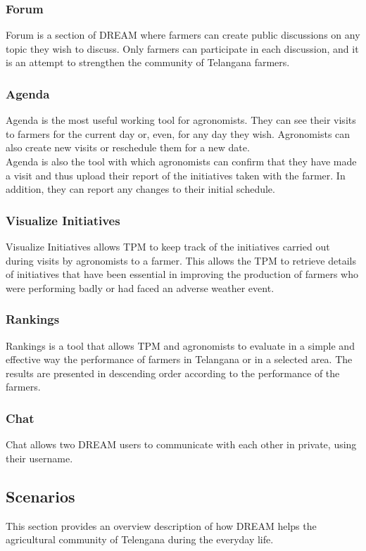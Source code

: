 \subsubsection{Forum}
Forum is a section of DREAM where farmers can create public discussions on any topic they wish to discuss. Only farmers can participate in each discussion, and it is an attempt to strengthen the community of Telangana farmers.
\subsubsection{Agenda}
Agenda is the most useful working tool for agronomists. They can see their visits to farmers for the current day or, even, for any day they wish. Agronomists can also create new visits or reschedule them for a new date.\\
Agenda is also the tool with which agronomists can confirm that they have made a visit and thus upload their report of the initiatives taken with the farmer. In addition, they can report any changes to their initial schedule.

\subsubsection{Visualize Initiatives}
Visualize Initiatives allows TPM to keep track of the initiatives carried out during visits by agronomists to a farmer. This allows the TPM to retrieve details of initiatives that have been essential in improving the production of farmers who were performing badly or had faced an adverse weather event.

\subsubsection{Rankings}
Rankings is a tool that allows TPM and agronomists to evaluate in a simple and effective way the performance of farmers in Telangana or in a selected area. The results are presented in descending order according to the performance of the farmers.

\subsubsection{Chat}
Chat allows two DREAM users to communicate with each other in private, using their username.

\subsection{Scenarios}
This section provides an overview description of how DREAM helps the agricultural community of Telengana during the everyday life.
